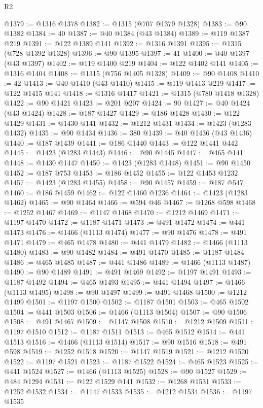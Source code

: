 \begin{lexlean}{R2}
\begin{coremodule}
@1379 := @1316 @1378
@1382 := @1315 (@707 @1379 @1328)
@1383 := @90 @1382
@1384 := 40
@1387 := @40 @1384 (@43 @1384)
@1389 := @119 @1387 @219
@1391 := @122 @1389 @141
@1392 := @1316 @1391
@1395 := @1315 (@728 @1392 @1328)
@1396 := @90 @1395
@1397 := 41
@1400 := @40 @1397 (@43 @1397)
@1402 := @119 @1400 @219
@1404 := @122 @1402 @141
@1405 := @1316 @1404
@1408 := @1315 (@756 @1405 @1328)
@1409 := @90 @1408
@1410 := 42
@1413 := @40 @1410 (@43 @1410)
@1415 := @119 @1413 @219
@1417 := @122 @1415 @141
@1418 := @1316 @1417
@1421 := @1315 (@780 @1418 @1328)
@1422 := @90 @1421
@1423 := @201 @207
@1424 := 90
@1427 := @40 @1424 (@43 @1424)
@1428 := @187 @1427
@1429 := @186 @1428
@1430 := @122 @1429
@1431 := @1430 @141
@1432 := @1212 @1431
@1434 := @1423 (@1283 @1432)
@1435 := @90 @1434
@1436 := 380
@1439 := @40 @1436 (@43 @1436)
@1440 := @187 @1439
@1441 := @186 @1440
@1443 := @122 @1441 @442
@1445 := @1423 (@1283 @1443)
@1446 := @90 @1445
@1447 := @465 @141
@1448 := @1430 @1447
@1450 := @1423 (@1283 @1448)
@1451 := @90 @1450
@1452 := @187 @753
@1453 := @186 @1452
@1455 := @122 @1453 @1232
@1457 := @1423 (@1283 @1455)
@1458 := @90 @1457
@1459 := @187 @547
@1460 := @186 @1459
@1462 := @122 @1460 @1236
@1464 := @1423 (@1283 @1462)
@1465 := @90 @1464
@1466 := @594 @46
@1467 := @1268 @598
@1468 := @1252 @1467
@1469 := @1147 @1468
@1470 := @1212 @1469
@1471 := @1197 @1470
@1472 := @1187 @1471
@1473 := @491 @1472
@1474 := @441 @1473
@1476 := @1466 (@1113 @1474)
@1477 := @90 @1476
@1478 := @491 @1471
@1479 := @465 @1478
@1480 := @441 @1479
@1482 := @1466 (@1113 @1480)
@1483 := @90 @1482
@1484 := @491 @1470
@1485 := @1187 @1484
@1486 := @465 @1485
@1487 := @441 @1486
@1489 := @1466 (@1113 @1487)
@1490 := @90 @1489
@1491 := @491 @1469
@1492 := @1197 @1491
@1493 := @1187 @1492
@1494 := @465 @1493
@1495 := @441 @1494
@1497 := @1466 (@1113 @1495)
@1498 := @90 @1497
@1499 := @491 @1468
@1500 := @1212 @1499
@1501 := @1197 @1500
@1502 := @1187 @1501
@1503 := @465 @1502
@1504 := @441 @1503
@1506 := @1466 (@1113 @1504)
@1507 := @90 @1506
@1508 := @491 @1467
@1509 := @1147 @1508
@1510 := @1212 @1509
@1511 := @1197 @1510
@1512 := @1187 @1511
@1513 := @465 @1512
@1514 := @441 @1513
@1516 := @1466 (@1113 @1514)
@1517 := @90 @1516
@1518 := @491 @598
@1519 := @1252 @1518
@1520 := @1147 @1519
@1521 := @1212 @1520
@1522 := @1197 @1521
@1523 := @1187 @1522
@1524 := @465 @1523
@1525 := @441 @1524
@1527 := @1466 (@1113 @1525)
@1528 := @90 @1527
@1529 := @484 @1294
@1531 := @122 @1529 @141
@1532 := @1268 @1531
@1533 := @1252 @1532
@1534 := @1147 @1533
@1535 := @1212 @1534
@1536 := @1197 @1535

\end{coremodule}
\end{lexlean}
